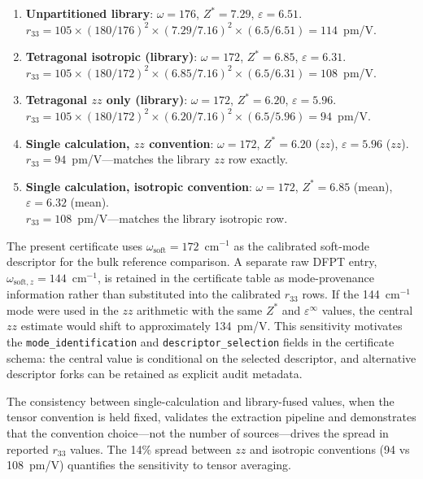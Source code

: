 \documentclass[onecolumn,superscriptaddress,amsmath,amssymb,longbibliography]{revtex4-2}
\begin{document}
\begin{enumerate}
    \item \textbf{Unpartitioned library}:
    $\omega = 176$, $Z^* = 7.29$, $\varepsilon = 6.51$. \\
    $r_{33} = 105 \times (180/176)^2 \times (7.29/7.16)^2 \times (6.5/6.51)
    = 114$~pm/V.

    \item \textbf{Tetragonal isotropic (library)}:
    $\omega = 172$, $Z^* = 6.85$, $\varepsilon = 6.31$. \\
    $r_{33} = 105 \times (180/172)^2 \times (6.85/7.16)^2 \times (6.5/6.31)
    = 108$~pm/V.

    \item \textbf{Tetragonal $zz$ only (library)}:
    $\omega = 172$, $Z^* = 6.20$, $\varepsilon = 5.96$. \\
    $r_{33} = 105 \times (180/172)^2 \times (6.20/7.16)^2 \times (6.5/5.96)
    = 94$~pm/V.

    \item \textbf{Single calculation, $zz$ convention}:
    $\omega = 172$, $Z^* = 6.20$ ($zz$), $\varepsilon = 5.96$ ($zz$). \\
    $r_{33} = 94$~pm/V---matches the library $zz$ row exactly.

    \item \textbf{Single calculation, isotropic convention}:
    $\omega = 172$, $Z^* = 6.85$ (mean), $\varepsilon = 6.32$ (mean). \\
    $r_{33} = 108$~pm/V---matches the library isotropic row.
\end{enumerate}

The present certificate uses $\omega_{\mathrm{soft}}=172$~cm$^{-1}$ as the
calibrated soft-mode descriptor for the bulk reference comparison. A separate
raw DFPT entry, $\omega_{\mathrm{soft},z}=144$~cm$^{-1}$, is retained in the
certificate table as mode-provenance information rather than substituted into
the calibrated $r_{33}$ rows. If the 144~cm$^{-1}$ mode were used in the
$zz$ arithmetic with the same $Z^*$ and $\varepsilon^\infty$ values, the
central $zz$ estimate would shift to approximately 134~pm/V. This sensitivity
motivates the \texttt{mode\_identification} and
\texttt{descriptor\_selection} fields in the certificate schema: the central
value is conditional on the selected descriptor, and alternative descriptor
forks can be retained as explicit audit metadata.

The consistency between single-calculation and library-fused values, when
the tensor convention is held fixed, validates the extraction pipeline and
demonstrates that the convention choice---not the number of
sources---drives the spread in reported $r_{33}$ values. The 14\% spread
between $zz$ and isotropic conventions (94 vs 108~pm/V) quantifies the
sensitivity to tensor averaging.
\end{document}
